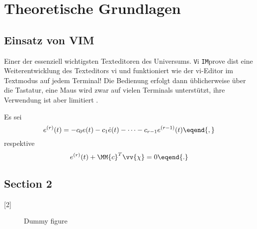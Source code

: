 \chapter{Theoretische Grundlagen}
\label{chap:theoretical_principles}
\section{Einsatz von VIM}
\label{sec:einsatz_von_vim}
Einer der essenziell wichtigsten Texteditoren des Universums.  \texttt{V}i
\texttt{IM}prove dist eine Weiterentwicklung des Texteditors vi und funktioniert
wie der vi-Editor im Textmodus auf jedem Terminal! Die Bedienung erfolgt dann
üblicherweise über die Tastatur, eine Maus wird zwar auf vielen Terminals
unterstützt, ihre Verwendung ist aber limitiert \cite{Mustermann2017}.

Es sei
\begin{equation} e^{(r)} (t) = -c_0e (t) - c_1 \dot{e} (t) - \dots - c_{r-1}
	e^{(r-1)} (t) \eqend{,}
\label{eq:Fehlerdynamik_siso}
\end{equation}
respektive
\begin{equation}
	e^{(r)} (t) + \MM{c}^T\vv{\chi} = 0
	\eqend{.}
\label{eq:Fehlerdynamik_siso_matrix}
\end{equation}
\blindtext[2]
\section{Section 2}
\label{sec:section_one}
\blindtext[1]
[2]
\blinddescription
\blindmathtrue
\blindmathfalse

\begin{figure}[!ht]
	\centering
	\label{fig:dummy}
	\caption{Dummy figure}
\end{figure}
\blindmathpaper
